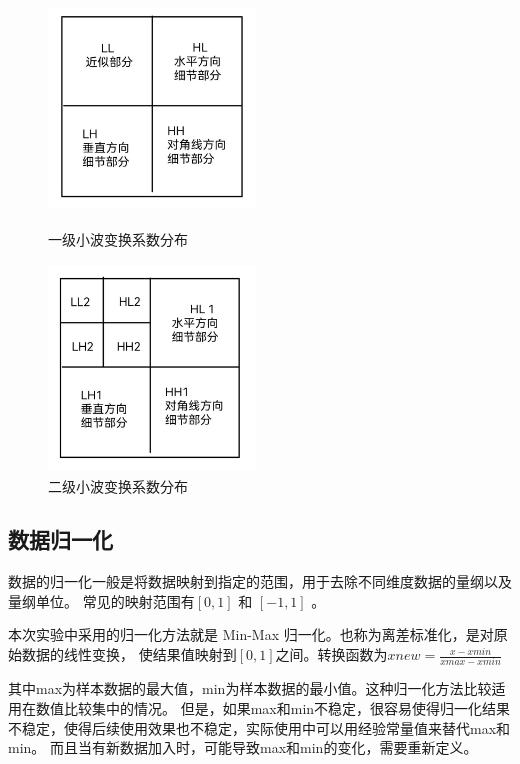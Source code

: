 \documentclass[a4paper,11pt,UTF8]{ctexart}
\begin{document}
    \begin{figure}[H]
      \begin{minipage}[t]{0.45\linewidth}
          \centering
          \includegraphics[width=5.5cm,height=5.5cm]{little_wave_1.jpg}
          \caption{一级小波变换系数分布}
      \end{minipage}
      \begin{minipage}[t]{0.45\linewidth}        %
          \hspace{10pt}
          \includegraphics[width=5.5cm,height=5.5cm]{little_wave_2.jpg}
          \caption{二级小波变换系数分布}
      \end{minipage}
    \end{figure}
  \subsection{数据归一化}
    数据的归一化一般是将数据映射到指定的范围，用于去除不同维度数据的量纲以及量纲单位。
    常见的映射范围有$\left [ 0,1 \right ]$  和 $\left [ -1,1 \right ]$ 。\par
    本次实验中采用的归一化方法就是 Min-Max 归一化。也称为离差标准化，是对原始数据的线性变换，
    使结果值映射到$\left [ 0,1 \right ]$之间。转换函数为$x{new}=\frac{x-x{min}}{x{max}-x{min}} $\par
    其中max为样本数据的最大值，min为样本数据的最小值。这种归一化方法比较适用在数值比较集中的情况。
    但是，如果max和min不稳定，很容易使得归一化结果不稳定，使得后续使用效果也不稳定，实际使用中可以用经验常量值来替代max和min。
    而且当有新数据加入时，可能导致max和min的变化，需要重新定义。
\end{document}
